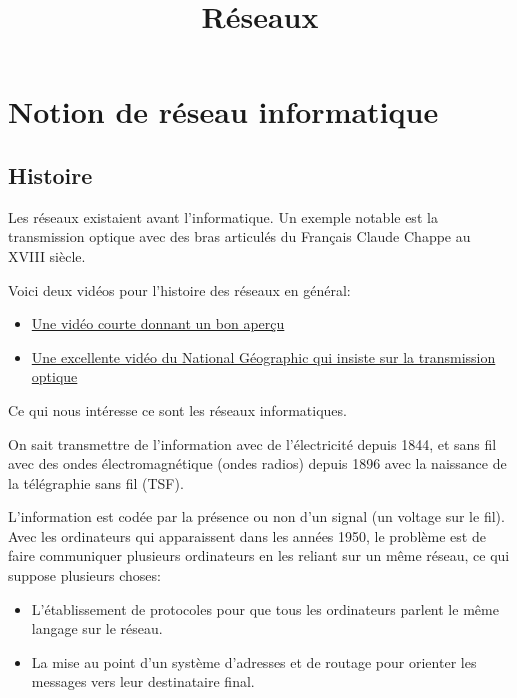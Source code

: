 \documentclass[a4paper,dvipsnames]{article}
\title{Réseaux}
\author{}
\date{}
\begin{document}
\renewcommand{\contentsname}{}

\pagestyle{fancy}

\begin{tcolorbox}[colframe=blue!75, colback=blue!45, valign=center, height=1.5cm, top=5mm]
  \maketitle
\end{tcolorbox}

\tableofcontents

\vspace{1cm}

\thispagestyle{fancy}

\section{Notion de réseau informatique}

\subsection{Histoire}

Les réseaux existaient avant l'informatique. Un exemple notable est la
transmission optique avec des bras articulés du Français Claude Chappe au
XVIII\ieme{} siècle.

Voici deux vidéos pour l'histoire des réseaux en général:
\begin{itemize}
\item
\href{https://www.youtube.com/watch?v=LKGkmbz57ds}{Une vidéo courte donnant un bon aperçu}

\item \href{https://www.youtube.com/watch?v=0kjlITYI9Lk}{Une excellente vidéo du National Géographic qui insiste sur la
  transmission optique}

\end{itemize}

Ce qui nous intéresse ce sont les réseaux informatiques.

On sait transmettre de l'information avec de l'électricité depuis 1844, et sans
fil avec des ondes électromagnétique (ondes radios) depuis 1896 avec la
naissance de la télégraphie sans fil (TSF).

L'information est codée par la présence ou non d'un signal (un voltage sur le
fil). Avec les ordinateurs qui apparaissent dans les années 1950, le problème
est de faire communiquer plusieurs ordinateurs en les reliant sur un même
réseau, ce qui suppose plusieurs choses:
\begin{itemize}
  \item L'établissement de protocoles pour que tous les ordinateurs parlent le
    même langage sur le réseau.
  \item La mise au point d'un système d'adresses et de routage pour orienter les
    messages vers leur destinataire final.
\end{itemize}
\end{document}
